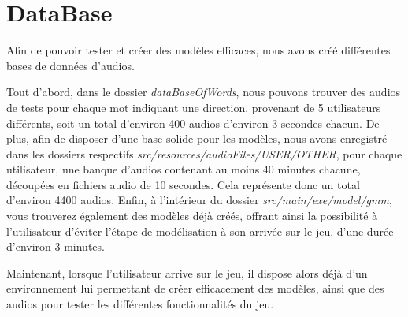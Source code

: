 \section{DataBase}
\label{sec:data_base}

Afin de pouvoir tester et créer des modèles efficaces,
nous avons créé différentes bases de données d'audios.

Tout d'abord, dans le dossier \textit{dataBaseOfWords},
nous pouvons trouver des audios de tests pour chaque mot indiquant une direction,
provenant de 5 utilisateurs différents,
soit un total d'environ 400 audios d'environ 3 secondes chacun.
De plus, afin de disposer d'une base solide pour les modèles,
nous avons enregistré dans les dossiers respectifs \textit{src/resources/audioFiles/USER/OTHER},
pour chaque utilisateur, une banque d'audios contenant au moins 40 minutes chacune,
découpées en fichiers audio de 10 secondes.
Cela représente donc un total d'environ 4400 audios.
Enfin, à l'intérieur du dossier \textit{src/main/exe/model/gmm},
vous trouverez également des modèles déjà créés,
offrant ainsi la possibilité à l'utilisateur d'éviter l'étape de modélisation à son arrivée sur le jeu,
d'une durée d'environ 3 minutes.

Maintenant, lorsque l'utilisateur arrive sur le jeu,
il dispose alors déjà d'un environnement lui permettant de créer efficacement des modèles,
ainsi que des audios pour tester les différentes fonctionnalités du jeu.
